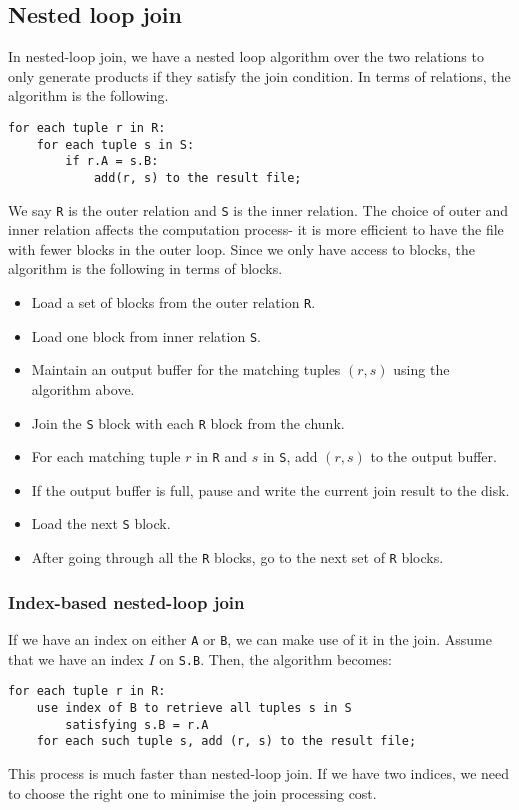 \documentclass[a4paper, openany]{memoir}
\theoremstyle{definition}
\theoremstyle{plain}
\begin{document}
\subsection{Nested loop join}
In nested-loop join, we have a nested loop algorithm over the two relations to only generate products if they satisfy the join condition. In terms of relations, the algorithm is the following.
\begin{verbatim}
for each tuple r in R:
    for each tuple s in S:
        if r.A = s.B:
            add(r, s) to the result file;
\end{verbatim}
We say \texttt{R} is the outer relation and \texttt{S} is the inner relation. The choice of outer and inner relation affects the computation process- it is more efficient to have the file with fewer blocks in the outer loop. Since we only have access to blocks, the algorithm is the following in terms of blocks.
\begin{itemize}
    \item Load a set of blocks from the outer relation \texttt{R}.
    \item Load one block from inner relation \texttt{S}.
    \item Maintain an output buffer for the matching tuples $(r, s)$ using the algorithm above.
    \item Join the \texttt{S} block with each \texttt{R} block from the chunk.
    \item For each matching tuple $r$ in \texttt{R} and $s$ in \texttt{S}, add $(r, s)$ to the output buffer.
    \item If the output buffer is full, pause and write the current join result to the disk.
    \item Load the next \texttt{S} block.
    \item After going through all the \texttt{R} blocks, go to the next set of \texttt{R} blocks.
\end{itemize}

\subsubsection{Index-based nested-loop join}
If we have an index on either \texttt{A} or \texttt{B}, we can make use of it in the join. Assume that we have an index $I$ on \texttt{S.B}. Then, the algorithm becomes:
\begin{verbatim}
for each tuple r in R:
    use index of B to retrieve all tuples s in S 
        satisfying s.B = r.A
    for each such tuple s, add (r, s) to the result file;
\end{verbatim} 
This process is much faster than nested-loop join. If we have two indices, we need to choose the right one to minimise the join processing cost.
\end{document}
